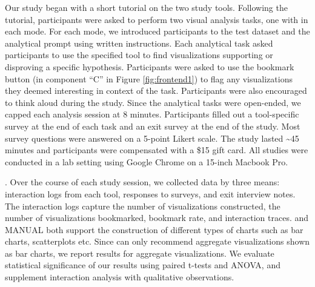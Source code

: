 Our study began with a short tutorial on the two study tools.
Following the tutorial, participants were asked to perform two visual analysis 
tasks, one with \SeeDB in each mode.
For each mode, we introduced participants to the test dataset
and the analytical prompt using written instructions.
Each analytical task asked participants to use the specified tool to find 
visualizations supporting or disproving a specific hypothesis.
Participants were asked to use the bookmark button (in component ``C'' in Figure 
\ref{fig:frontend1}) to flag any visualizations they deemed interesting in
context of the task.
Participants were also encouraged to think aloud during the study.
Since the analytical tasks were open-ended, we capped each analysis session at 8 minutes.
Participants filled out a tool-specific survey at the end of each task and
an exit survey at the end of the study.
Most survey questions were answered on a 5-point Likert scale.
The study lasted \textasciitilde 45 minutes and participants were compensated 
 with a \$15 gift card.
All studies were conducted in a lab setting using Google Chrome on a 15-inch 
Macbook Pro.

.
Over the course of each study session, we collected data by three means: interaction logs 
from each tool, responses to surveys, and exit interview notes.
The interaction logs capture the number of visualizations
constructed, the number of visualizations bookmarked, bookmark rate, and interaction traces.
\SeeDB and MANUAL both support the construction of different types of charts such as bar 
charts, scatterplots etc.
Since \SeeDB can only recommend aggregate visualizations shown as bar charts,
we report results for aggregate visualizations.
We evaluate statistical significance of our results using paired t-tests and ANOVA,
and supplement interaction analysis with qualitative observations.



